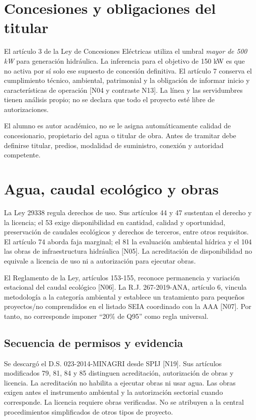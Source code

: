 \section{Concesiones y obligaciones del titular}
El artículo 3 de la Ley de Concesiones Eléctricas utiliza el umbral \emph{mayor de 500 kW} para generación hidráulica. La inferencia para el objetivo de 150 kW es que no activa por sí solo ese supuesto de concesión definitiva. El artículo 7 conserva el cumplimiento técnico, ambiental, patrimonial y la obligación de informar inicio y características de operación [N04 y contraste N13]. La línea y las servidumbres tienen análisis propio; no se declara que todo el proyecto esté libre de autorizaciones.

El alumno es autor académico, no se le asigna automáticamente calidad de concesionario, propietario del agua o titular de obra. Antes de tramitar debe definirse titular, predios, modalidad de suministro, conexión y autoridad competente.

\section{Agua, caudal ecológico y obras}
La Ley 29338 regula derechos de uso. Sus artículos 44 y 47 sustentan el derecho y la licencia; el 53 exige disponibilidad en cantidad, calidad y oportunidad, preservación de caudales ecológicos y derechos de terceros, entre otros requisitos. El artículo 74 aborda faja marginal; el 81 la evaluación ambiental hídrica y el 104 las obras de infraestructura hidráulica [N05]. La acreditación de disponibilidad no equivale a licencia de uso ni a autorización para ejecutar obras.

El Reglamento de la Ley, artículos 153-155, reconoce permanencia y variación estacional del caudal ecológico [N06]. La R.J. 267-2019-ANA, artículo 6, vincula metodología a la categoría ambiental y establece un tratamiento para pequeños proyectos/no comprendidos en el listado SEIA coordinado con la AAA [N07]. Por tanto, no corresponde imponer ``20\% de Q95'' como regla universal.

\subsection{Secuencia de permisos y evidencia}
Se descargó el D.S. 023-2014-MINAGRI desde SPIJ [N19]. Sus artículos modificados 79, 81, 84 y 85 distinguen acreditación, autorización de obras y licencia. La acreditación no habilita a ejecutar obras ni usar agua. Las obras exigen antes el instrumento ambiental y la autorización sectorial cuando corresponde. La licencia requiere obras verificadas. No se atribuyen a la central procedimientos simplificados de otros tipos de proyecto.

